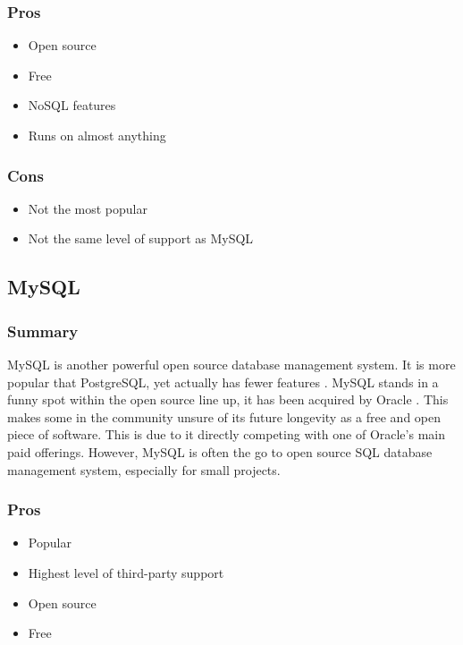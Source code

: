 \documentclass[draftclsnofoot,onecolumn,journal,letterpaper,compsoc,10pt]{IEEEtran}
\begin{document}
        \subsubsection{Pros}
        \begin{itemize}
            \item Open source
            \item Free
            \item NoSQL features
            \item Runs on almost anything \cite{db_comparison}
        \end{itemize}
        
        \subsubsection{Cons}
        \begin{itemize}
            \item Not the most popular
            \item Not the same level of support as MySQL
        \end{itemize}
    
    \subsection{MySQL}
    
        \subsubsection{Summary}
        
        MySQL is another powerful open source database management system.  It is more popular that PostgreSQL, yet actually has fewer features \cite{db_comparison}.  MySQL stands in a funny spot within the open source line up, it has been acquired by Oracle \cite{mysql}.  This makes some in the community unsure of its future longevity as a free and open piece of software.  This is due to it directly competing with one of Oracle's main paid offerings.  However, MySQL is often the go to open source SQL database management system, especially for small projects.
        
        \subsubsection{Pros}
        \begin{itemize}
            \item Popular
            \item Highest level of third-party support
            \item Open source
            \item Free
        \end{itemize}
        
\end{document}
